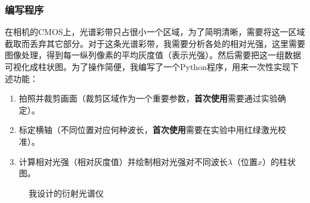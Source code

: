 \documentclass[UTF8]{ctexart}
\begin{document}
\subsubsection{编写程序}
在相机的CMOS上，光谱彩带只占很小一个区域，为了简明清晰，需要将这一区域截取而丢弃其它部分。对于这条光谱彩带，我需要分析各处的相对光强，这里需要图像处理，得到每一纵列像素的平均灰度值（表示光强）。然后需要把这一组数据可视化成柱状图。为了操作简便，我编写了一个Python程序，用来一次性实现下述功能：
\begin{enumerate}
    \item 拍照并裁剪画面（裁剪区域作为一个重要参数，\textbf{首次使用}需要通过实验确定）。
    \item 标定横轴（不同位置对应何种波长，\textbf{首次使用}需要在实验中用红绿激光校准）。
    \item 计算相对光强（相对灰度值）并绘制相对光强对不同波长$\lambda$（位置$x$）的柱状图。
\end{enumerate}
\begin{figure}
\centering  %
\caption{我设计的衍射光谱仪}
\label{光谱仪}
\end{figure}
\end{document}
